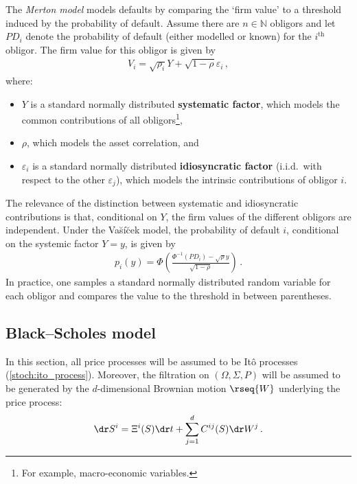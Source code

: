     The \textit{Merton model} models defaults by comparing the `firm value' to a threshold induced by the probability of default. Assume there are $n\in\mathbb{N}$ obligors and let $PD_i$ denote the probability of default (either modelled or known) for the $i^{\text{th}}$ obligor. The firm value for this obligor is given by
    \begin{gather}
        V_i = \sqrt{\rho_i}Y + \sqrt{1-\rho}\varepsilon_i\,,
    \end{gather}
    where:
    \begin{itemize}
        \item $Y$ is a standard normally distributed \textbf{systematic factor}, which models the common contributions of all obligors\footnote{For example, macro-economic variables.},
        \item $\rho$, which models the asset correlation, and
        \item $\varepsilon_i$ is a standard normally distributed \textbf{idiosyncratic factor} (i.i.d.~with respect to the other $\varepsilon_j$), which models the intrinsic contributions of obligor $i$.
    \end{itemize}
    The relevance of the distinction between systematic and idiosyncratic contributions is that, conditional on $Y$, the firm values of the different obligors are independent. Under the Va\u{s}\'i\u{c}ek model, the probability of default $i$, conditional on the systemic factor $Y=y$, is given by
    \begin{gather}
        p_i(y) = \Phi\left(\frac{\Phi^{-1}(PD_i)-\sqrt{\rho}y}{\sqrt{1-\rho}}\right)\,.
    \end{gather}
    In practice, one samples a standard normally distributed random variable for each obligor and compares the value to the threshold in between parentheses.

\subsection{Black--Scholes model}

    In this section, all price processes will be assumed to be It\^o processes (\cref{stoch:ito_process}). Moreover, the filtration on $(\Omega,\Sigma,P)$ will be assumed to be generated by the $d$-dimensional Brownian motion $\rseq{W}$ underlying the price process:
    \begin{gather}
        \dr S^i = \Xi^i(S)\dr t + \sum_{j=1}^dC^{ij}(S)\dr W^j\,.
    \end{gather}

